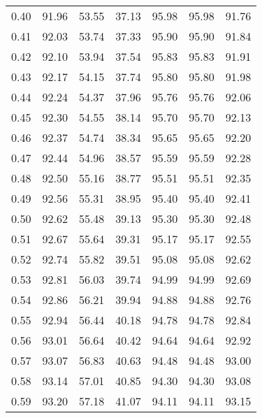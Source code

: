 \begin{tabular}{|c|c|c|c|c|c|c|}
      0.40 &     91.96 &     53.55 &      37.13 &   95.98 &      95.98 &         91.76 \\
      0.41 &     92.03 &     53.74 &      37.33 &   95.90 &      95.90 &         91.84 \\
      0.42 &     92.10 &     53.94 &      37.54 &   95.83 &      95.83 &         91.91 \\
      0.43 &     92.17 &     54.15 &      37.74 &   95.80 &      95.80 &         91.98 \\
      0.44 &     92.24 &     54.37 &      37.96 &   95.76 &      95.76 &         92.06 \\
      0.45 &     92.30 &     54.55 &      38.14 &   95.70 &      95.70 &         92.13 \\
      0.46 &     92.37 &     54.74 &      38.34 &   95.65 &      95.65 &         92.20 \\
      0.47 &     92.44 &     54.96 &      38.57 &   95.59 &      95.59 &         92.28 \\
      0.48 &     92.50 &     55.16 &      38.77 &   95.51 &      95.51 &         92.35 \\
      0.49 &     92.56 &     55.31 &      38.95 &   95.40 &      95.40 &         92.41 \\
      0.50 &     92.62 &     55.48 &      39.13 &   95.30 &      95.30 &         92.48 \\
      0.51 &     92.67 &     55.64 &      39.31 &   95.17 &      95.17 &         92.55 \\
      0.52 &     92.74 &     55.82 &      39.51 &   95.08 &      95.08 &         92.62 \\
      0.53 &     92.81 &     56.03 &      39.74 &   94.99 &      94.99 &         92.69 \\
      0.54 &     92.86 &     56.21 &      39.94 &   94.88 &      94.88 &         92.76 \\
      0.55 &     92.94 &     56.44 &      40.18 &   94.78 &      94.78 &         92.84 \\
      0.56 &     93.01 &     56.64 &      40.42 &   94.64 &      94.64 &         92.92 \\
      0.57 &     93.07 &     56.83 &      40.63 &   94.48 &      94.48 &         93.00 \\
      0.58 &     93.14 &     57.01 &      40.85 &   94.30 &      94.30 &         93.08 \\
      0.59 &     93.20 &     57.18 &      41.07 &   94.11 &      94.11 &         93.15 \\

\end{tabular}
